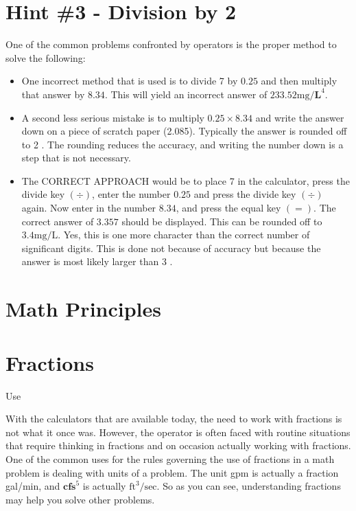 \documentclass[10pt]{article}
\begin{document}
\section{Hint \#3 - Division by 2}
One of the common problems confronted by operators is the proper method to solve the following:

\begin{itemize}
  \item One incorrect method that is used is to divide 7 by $0.25$ and then multiply that answer by $8.34$. This will yield an incorrect answer of $233.52 \mathrm{mg} / \mathbf{L}^{4}$.

  \item A second less serious mistake is to multiply $0.25 \times 8.34$ and write the answer down on a piece of scratch paper (2.085). Typically the answer is rounded off to 2 . The rounding reduces the accuracy, and writing the number down is a step that is not necessary.

  \item The CORRECT APPROACH would be to place 7 in the calculator, press the divide key $(\div)$, enter the number $0.25$ and press the divide key $(\div)$ again. Now enter in the number $8.34$, and press the equal key $(=)$. The correct answer of $3.357$ should be displayed. This can be rounded off to $3.4 \mathrm{mg} / \mathrm{L}$. Yes, this is one more character than the correct number of significant digits. This is done not because of accuracy but because the answer is most likely larger than 3 .

\end{itemize}
\section{Math Principles}
\section{Fractions}
Use

With the calculators that are available today, the need to work with fractions is not what it once was. However, the operator is often faced with routine situations that require thinking in fractions and on occasion actually working with fractions. One of the common uses for the rules governing the use of fractions in a math problem is dealing with units of a problem. The unit gpm is actually a fraction gal/min, and $\mathbf{c f s}^{5}$ is actually $\mathrm{ft}^{3} / \mathrm{sec}$. So as you can see, understanding fractions may help you solve other problems.
\end{document}
